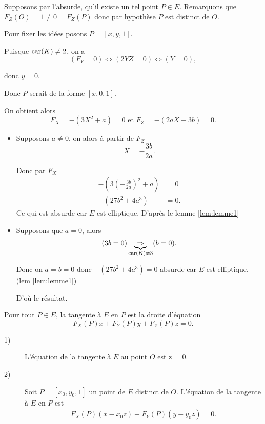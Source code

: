 \begin{demonstration}
   Supposons par l'absurde, qu'il existe un tel point $P \in E$. Remarquons que $F_{Z}(O) = 1 \neq 0 = F_{Z}(P)$ donc par hypothèse $P$ est distinct de $O$.

   Pour fixer les idées posons $P = [x,y,1]$.

   Puisque $\operatorname{car}(K) \neq 2$, on a
   \[
       (F_{Y} = 0) \iff (2YZ = 0) \iff (Y = 0) 
   ,\] 

   donc $y = 0$.
   
   Donc $P$ serait de la forme $[x,0,1]$.
   
   On obtient alors
   \[
   F_{X} = - \left( 3X^2 + a \right) = 0 \text{ et } F_{Z} = -\left( 2aX + 3b \right) = 0
   .\] 
   
   \begin{itemize}
       \item Supposons $a \neq 0$, on alors à partir de $F_{Z}$
   \[
       X = - \frac{3b}{2a} 
   .\] 

   Donc par $F_{X}$
\begin{align*}
    - \left( 3 (- \frac{3b}{2a})^2 + a \right) &= 0 \\
    - \left( 27b^2 + 4a^3 \right) &= 0
.\end{align*}
Ce qui est absurde car $E$ est elliptique. D'après le lemme \ref{lem:lemme1}
        \item Supposons que $a = 0$, alors
            \[
                (3b = 0) \underbrace{\Rightarrow}_{\operatorname{car}(K) \neq 3} (b = 0)
            .\] 

            Donc on $a = b = 0$ donc $-\left( 27b^2 + 4a^3 \right) = 0$ absurde car $E$ est elliptique. (lem \ref{lem:lemme1})

            D'où le résultat.
   \end{itemize}
\end{demonstration}

\begin{definition}
    Pour tout $P \in E$, la tangente à $E$ en $P$ est la droite d'équation
    \[
    F_{X}(P)x+F_{Y}(P)y+F_{Z}(P)z=0
    .\] 
\end{definition}

\begin{lemme}
    \label{lem:lemme4}
    
    \begin{description}
        \item[1)] L'équation de la tangente à $E$ au point $O$ est z = 0.
        \item[2)] Soit $P = \left[ x_0, y_0, 1 \right]$ un point de $E$ distinct de $O$. L'équation de la tangente à $E$ en $P$ est
            \begin{align*}
            \label{eq:tangente}
            F_{X}(P)\left( x - x_0z \right) + F_{Y}(P)\left( y - y_0z \right) = 0
            .\end{align*}
    \end{description}
\end{lemme}

